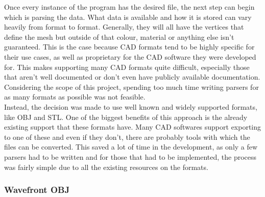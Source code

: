 Once every instance of the program has the desired file, the next step can begin which is parsing the data. What data is available and how it is stored can vary heavily from format to format. Generally, they will all have the vertices that define the mesh but outside of that colour, material or anything else isn't guaranteed. This is the case because \acs{CAD} formats tend to be highly specific for their use cases, as well as proprietary for the \acs{CAD} software they were developed for. This makes supporting many \acs{CAD} formats quite difficult, especially those that aren't well documented or don't even have publicly available documentation. Considering the scope of this project, spending too much time writing parsers for as many formats as possible was not feasible.\\
Instead, the decision was made to use well known and widely supported formats, like OBJ and STL. One of the biggest benefits of this approach is the already existing support that these formats have. Many \acs{CAD} softwares support exporting to one of these and even if they don't, there are probably tools with which the files can be converted. This saved a lot of time in the development, as only a few parsers had to be written and for those that had to be implemented, the process was fairly simple due to all the existing resources on the formats.

\subsubsection{Wavefront OBJ}

